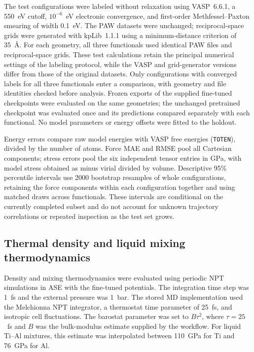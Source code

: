 The test configurations were labeled without relaxation using VASP~6.6.1, a 550~eV cutoff, $10^{-6}$~eV electronic convergence, and first-order Methfessel--Paxton smearing of width 0.1~eV.
The PAW datasets were unchanged; reciprocal-space grids were generated with kpLib~1.1.1 using a minimum-distance criterion of 35~\AA.
For each geometry, all three functionals used identical PAW files and reciprocal-space grids.
These test calculations retain the principal numerical settings of the labeling protocol, while the VASP and grid-generator versions differ from those of the original datasets.
Only configurations with converged labels for all three functionals enter a comparison, with geometry and file identities checked before analysis.
Frozen exports of the supplied fine-tuned checkpoints were evaluated on the same geometries; the unchanged pretrained checkpoint was evaluated once and its predictions compared separately with each functional.
No model parameters or energy offsets were fitted to the holdout.

Energy errors compare raw model energies with VASP free energies (\texttt{TOTEN}), divided by the number of atoms.
Force MAE and RMSE pool all Cartesian components; stress errors pool the six independent tensor entries in GPa, with model stress obtained as minus virial divided by volume.
Descriptive 95\% percentile intervals use 2000 bootstrap resamples of whole configurations, retaining the force components within each configuration together and using matched draws across functionals.
These intervals are conditional on the currently completed subset and do not account for unknown trajectory correlations or repeated inspection as the test set grows.

\subsection{Thermal density and liquid mixing thermodynamics}
\label{sec:thermodynamics}

Density and mixing thermodynamics were evaluated using periodic NPT simulations in ASE with the fine-tuned potentials.
The integration time step was 1~fs and the external pressure was 1~bar.
The stored MD implementation used the Melchionna NPT integrator, a thermostat time parameter of 25~fs, and isotropic cell fluctuations.
The barostat parameter was set to $B\tau^2$, where $\tau=25$~fs and $B$ was the bulk-modulus estimate supplied by the workflow.
For liquid Ti--Al mixtures, this estimate was interpolated between 110~GPa for Ti and 76~GPa for Al.

